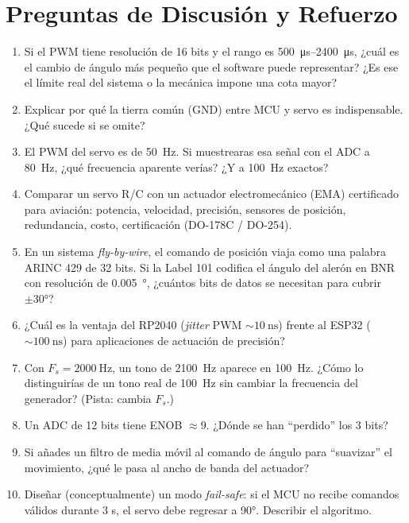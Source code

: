 \documentclass[11pt]{article}
\begin{document}
\section{Preguntas de Discusión y Refuerzo}
\begin{enumerate}
  \item Si el PWM tiene resolución de 16 bits y el rango es \SIrange{500}{2400}{\micro\second},
        ¿cuál es el cambio de ángulo más pequeño que el software puede representar? ¿Es
        ese el límite real del sistema o la mecánica impone una cota mayor?
  \item Explicar por qué la tierra común (GND) entre MCU y servo es indispensable. ¿Qué
        sucede si se omite?
  \item El PWM del servo es de \SI{50}{\hertz}. Si muestrearas esa señal con el ADC a
        \SI{80}{\hertz}, ¿qué frecuencia aparente verías? ¿Y a \SI{100}{\hertz} exactos?
  \item Comparar un servo R/C con un actuador electromecánico (EMA) certificado para
        aviación: potencia, velocidad, precisión, sensores de posición, redundancia,
        costo, certificación (DO-178C / DO-254).
  \item En un sistema \emph{fly-by-wire}, el comando de posición viaja como una palabra
        ARINC 429 de 32 bits. Si la Label 101 codifica el ángulo del alerón en BNR con
        resolución de \SI{0.005}{\degree}, ¿cuántos bits de datos se necesitan para cubrir
        $\pm 30\si{\degree}$?
  \item ¿Cuál es la ventaja del RP2040 (\emph{jitter} PWM $\sim\SI{10}{\nano\second}$)
        frente al ESP32 ($\sim\SI{100}{\nano\second}$) para aplicaciones de actuación de
        precisión?
  \item Con $F_s=\SI{2000}{\hertz}$, un tono de \SI{2100}{\hertz} aparece en
        \SI{100}{\hertz}. ¿Cómo lo distinguirías de un tono real de \SI{100}{\hertz} sin
        cambiar la frecuencia del generador? (Pista: cambia $F_s$.)
  \item Un ADC de 12 bits tiene ENOB $\approx 9$. ¿Dónde se han ``perdido'' los 3 bits?
  \item Si añades un filtro de media móvil al comando de ángulo para ``suavizar'' el
        movimiento, ¿qué le pasa al ancho de banda del actuador?
  \item Diseñar (conceptualmente) un modo \emph{fail-safe}: si el MCU no recibe comandos
        válidos durante 3 s, el servo debe regresar a 90\si{\degree}. Describir el algoritmo.
\end{enumerate}
\end{document}
